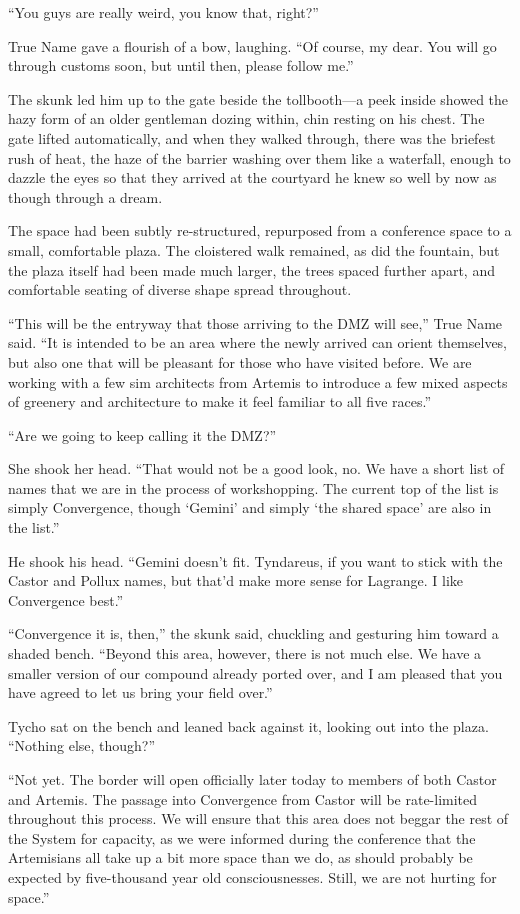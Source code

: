``You guys are really weird, you know that, right?''

True Name gave a flourish of a bow, laughing. ``Of course, my dear. You will go through customs soon, but until then, please follow me.''

The skunk led him up to the gate beside the tollbooth—a peek inside showed the hazy form of an older gentleman dozing within, chin resting on his chest. The gate lifted automatically, and when they walked through, there was the briefest rush of heat, the haze of the barrier washing over them like a waterfall, enough to dazzle the eyes so that they arrived at the courtyard he knew so well by now as though through a dream.

The space had been subtly re-structured, repurposed from a conference space to a small, comfortable plaza. The cloistered walk remained, as did the fountain, but the plaza itself had been made much larger, the trees spaced further apart, and comfortable seating of diverse shape spread throughout.

``This will be the entryway that those arriving to the DMZ will see,'' True Name said. ``It is intended to be an area where the newly arrived can orient themselves, but also one that will be pleasant for those who have visited before. We are working with a few sim architects from Artemis to introduce a few mixed aspects of greenery and architecture to make it feel familiar to all five races.''

``Are we going to keep calling it the DMZ?''

She shook her head. ``That would not be a good look, no. We have a short list of names that we are in the process of workshopping. The current top of the list is simply Convergence, though `Gemini' and simply `the shared space' are also in the list.''

He shook his head. ``Gemini doesn't fit. Tyndareus, if you want to stick with the Castor and Pollux names, but that'd make more sense for Lagrange. I like Convergence best.''

``Convergence it is, then,'' the skunk said, chuckling and gesturing him toward a shaded bench. ``Beyond this area, however, there is not much else. We have a smaller version of our compound already ported over, and I am pleased that you have agreed to let us bring your field over.''

Tycho sat on the bench and leaned back against it, looking out into the plaza. ``Nothing else, though?''

``Not yet. The border will open officially later today to members of both Castor and Artemis. The passage into Convergence from Castor will be rate-limited throughout this process. We will ensure that this area does not beggar the rest of the System for capacity, as we were informed during the conference that the Artemisians all take up a bit more space than we do, as should probably be expected by five-thousand year old consciousnesses. Still, we are not hurting for space.''

